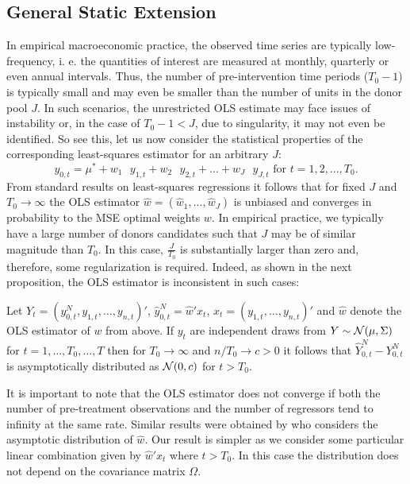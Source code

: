 \subsection{General Static Extension}
In empirical macroeconomic practice, the observed time series are typically low- frequency, i. e.
the quantities of interest are measured at monthly, quarterly or even annual intervals. Thus, the number of pre-intervention time periods ($T_0 - 1$) is typically small and may even be smaller than the number of units in the donor pool $J$. In such scenarios, the unrestricted \ac{OLS} estimate may face issues of instability or, in the case of 
$T_0 - 1 < J$, due to singularity, it may not even be identified. So see this, let us now consider the statistical properties of the corresponding least-squares estimator for an arbitrary $J$:
\begin{equation*}
	y_{0,t} = \mu^* + w_1 \text{ }  y_{1,t} + w_2 \text{ } y_{2,t} + ... + w_J \text{ } y_{J,t} \text{ for } t = 1,2,...,T_0.
\end{equation*}
From standard results on least-squares regressions it follows that for fixed $J$ and $T_0 \to \infty$ the \ac{OLS} estimator $\widehat{w} = (\widehat{w}_1, ..., \widehat{w}_J)$ is unbiased and converges in probability to the \ac{MSE} optimal weights $w$. In empirical practice, we typically have a large number of donors candidates such that $J$ may be of similar magnitude than $T_0$. In this case, $\frac{J}{T_0}$ is substantially larger than zero and, therefore, some regularization is required. Indeed, as shown in the next proposition, the \ac{OLS} estimator is inconsistent in such cases:

\begin{proposition}
	Let $Y_t=(y_{0,t}^N,y_{1,t},\ldots, y_{n,t})'$, $\widehat y_{0,t}^N = \widehat w'x_t$, $x_t=(y_{1,t},\ldots,y_{n,t})'$ and $\widehat w$ denote the OLS estimator of $w$ from above. If ${y}_t$ are independent draws from ${Y} \sim {\cal N}(\mu,\Sigma)$ for $t=1,\ldots,T_0,\ldots,T$ then for $T_0 \to \infty$ and $n/T_0 \to c>0$ it follows that $\widehat Y_{0,t}^N - Y_{0,t}^N$ is asymptotically distributed as ${\cal N}(0,c)$  for $t>T_0$.
\end{proposition}

It is important to note that the OLS estimator does not converge if both the number of pre-treatment observations and the number of regressors tend to infinity at the same rate. Similar results were obtained by \cite{bekker:1994} who considers the asymptotic distribution of $\widehat w$. Our result is simpler as we consider some particular linear combination given by $\widehat w'x_t$ where $t>T_0$. In this case the distribution does not depend on the covariance matrix $\Omega$.

